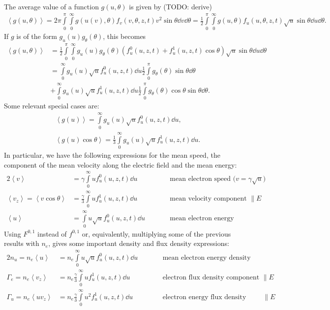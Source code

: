 \documentclass{book}
\newcommand{\MEAN}[1]{\ensuremath{\!\left\langle{{#1}}\right\rangle}}
\begin{document}
The average value of a function $g(u,\theta)$ is given by (TODO: derive)
\begin{align}
	\MEAN{g(u,\theta)}
	=
	2\pi\int\limits_0^\pi\int\limits_0^\infty g(u(v),\theta)f_v(v,\theta,z,t)v^2\sin\theta\dd{v}\dd{\theta}
	=
	\frac{1}{2}\int\limits_0^\pi\int\limits_0^\infty g(u,\theta)f_u(u,\theta,z,t)\sqrt{u}\sin\theta\dd{u}\dd{\theta}.
\end{align}
If $g$ is of the form $g_u(u)g_\theta(\theta)$, this becomes
\begin{align}
	\MEAN{g(u,\theta)}
	&=
	\frac{1}{2}\int\limits_0^\pi\int\limits_0^\infty g_u(u)g_\theta(\theta)
		\left(f^0_u(u,z,t) + f^1_u(u,z,t)\cos\theta\right)\sqrt{u}\sin\theta\dd{u}\dd{\theta}
	\nonumber \\
	&=
	\int\limits_0^\infty g_u(u)\sqrt{u}f^0_u(u,z,t)\dd{u}
		\frac{1}{2}\int\limits_0^\pi g_\theta(\theta)\sin\theta\dd{\theta}
	\nonumber \\
	&+
	\int\limits_0^\infty g_u(u)\sqrt{u}f^1_u(u,z,t)\dd{u}
		\frac{1}{2}\int\limits_0^\pi g_\theta(\theta)\cos\theta\sin\theta\dd{\theta}.
\end{align}
Some relevant special cases are:
\begin{align}
	\MEAN{g(u)}
		= \int\limits_0^\infty g_u(u)\sqrt{u}f^0_u(u,z,t)\dd{u}, \\
	\MEAN{g(u)\cos\theta}
		= \frac{1}{3}\int\limits_0^\infty g_u(u)\sqrt{u}f^1_u(u,z,t)\dd{u}.
\end{align}
In particular, we have the following expressions for the mean speed, the component of the
mean velocity along the electric field and the mean energy:
\begin{alignat}{2}
	\MEAN{v} &= \gamma\int\limits_0^\infty u f^0_u(u,z,t)\dd{u} && \quad\quad\text{mean electron speed ($v=\gamma \sqrt{u}$)} \label{eq:meanv} \\
	\MEAN{v_z} = \MEAN{v\cos\theta} &= \frac{\gamma}{3}\int\limits_0^\infty uf^1_u(u,z,t)\dd{u} && \quad\quad\text{mean velocity component $\parallel E$} \label{eq:meanvz} \\
	\MEAN{u} &= \int\limits_0^\infty u\sqrt{u} f^0_u(u,z,t)\dd{u} && \quad\quad\text{mean electron energy} \label{eq:meanu}
\end{alignat}
Using $F^{0,1}$ instead of $f^{0,1}$ or, equivalently, multiplying some of the previous results
with $n_e$, gives some important density and flux density expressions:
\begin{alignat}{2}
	n_u = n_e\MEAN{u} &= n_e\int\limits_0^\infty u\sqrt{u} f^0_u(u,z,t)\dd{u} && \quad\quad\text{mean electron energy density} \label{eq:n_u} \\
	\Gamma_e = n_e\MEAN{v_z} &= n_e\frac{\gamma}{3}\int\limits_0^\infty uf^1_u(u,z,t)\dd{u} && \quad\quad\text{electron flux density component $\parallel E$} \label{eq:Gamma_e} \\
	\Gamma_u = n_e\MEAN{uv_z} &= n_e\frac{\gamma}{3}\int\limits_0^\infty u^2f^1_u(u,z,t)\dd{u} && \quad\quad\text{electron energy flux density component $\parallel E$} \label{eq:Gamma_u}
\end{alignat}
\end{document}
